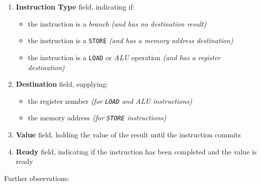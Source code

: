 \documentclass[english]{article}
\begin{document}
\begin{enumerate}
  \item \textbf{Instruction Type} field, indicating if:
        \begin{itemize}
          \item the instruction is a \textit{branch} \textit{(and has no destination result)}
          \item the instruction is a \texttt{STORE} \textit{(and has a memory address destination)}
          \item the instruction is a \texttt{LOAD} or \textit{ALU} operation \textit{(and has a register destination)}
        \end{itemize}
  \item \textbf{Destination} field, supplying:
        \begin{itemize}
          \item the register number \textit{(for \texttt{LOAD} and \textit{ALU} instructions)}
          \item the memory address \textit{(for \texttt{STORE} instructions)}
        \end{itemize}
  \item \textbf{Value} field, holding the value of the result until the instruction commits
  \item \textbf{Ready} field, indicating if the instruction has been completed and the value is ready
\end{enumerate}

\bigskip
Further observations:
\end{document}
